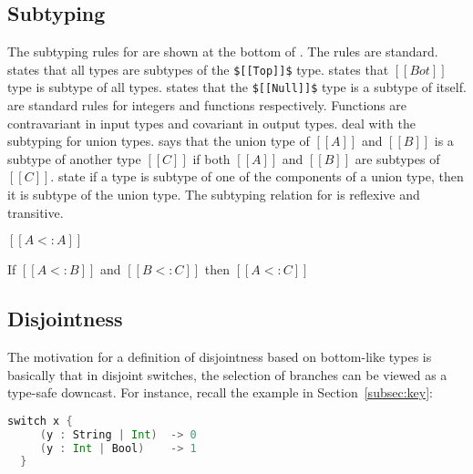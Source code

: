 
\subsection{Subtyping}
\label{sec:union:sub}
The subtyping rules for \name are shown at the bottom of
. The rules are standard.
 states that all types are subtypes of
the \lstinline{$[[Top]]$} type.  states that $[[Bot]]$ type is subtype of
all types.  states that the \lstinline{$[[Null]]$} type is a subtype of itself.
 are standard rules for integers and
functions respectively.  Functions are contravariant in input types
and covariant in output types.  deal with the
subtyping for union types.  says that the union type of $[[A]]$ and $[[B]]$
is a subtype of another type $[[C]]$ if both $[[A]]$ and $[[B]]$ are subtypes of
$[[C]]$.  state if a
type is subtype of one of the components of a union type, then it is subtype of the
union type.
The subtyping relation for \name is reflexive and transitive.

\begin{lemma}
  $[[A <: A]]$
\label{lemma:union:sub:refl}
\end{lemma}

\begin{lemma}
  If $[[A <: B]]$ and $[[B <: C]]$ then $[[A <: C]]$
\label{lemma:union:sub:trans}
\end{lemma}



\subsection{Disjointness}\label{sec:union:disj}

The motivation for a definition of disjointness based on bottom-like types is
basically that in disjoint switches, the selection of branches can be viewed
as a type-safe downcast. For instance, recall the example in Section~\ref{subsec:key}:

\begin{lstlisting}[language=Scala]
  switch x {
     (y : String | Int)  -> 0
     (y : Int | Bool)    -> 1
  }
\end{lstlisting}

